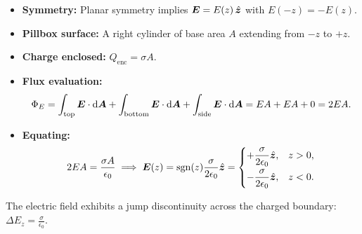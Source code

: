 \begin{example}
\begin{itemize}\itemsep2pt
    \item \textbf{Symmetry:} Planar symmetry implies $\vb*{E} = E(z)\,\hat{\vb*{z}}$ with $E(-z) = -E(z)$.
    \item \textbf{Pillbox surface:} A right cylinder of base area $A$ extending from $-z$ to $+z$.
    \item \textbf{Charge enclosed:} $Q_{\text{enc}} = \sigma A$.
    \item \textbf{Flux evaluation:}
    \begin{equation}
        \Phi_E = \int_{\text{top}} \vb*{E} \cdot \dd{\vb*{A}} + \int_{\text{bottom}} \vb*{E} \cdot \dd{\vb*{A}} + \int_{\text{side}} \vb*{E} \cdot \dd{\vb*{A}} = EA + EA + 0 = 2EA.
    \end{equation}
    \item \textbf{Equating:}
    \begin{equation}
        2EA = \frac{\sigma A}{\epsilon_0} \implies \vb*{E}(z) = \operatorname{sgn}(z)\frac{\sigma}{2\epsilon_0}\hat{\vb*{z}} = 
        \begin{cases}
            +\dfrac{\sigma}{2\epsilon_0}\hat{\vb*{z}}, & z > 0, \\[0.7em]
            -\dfrac{\sigma}{2\epsilon_0}\hat{\vb*{z}}, & z < 0.
        \end{cases}
    \end{equation}
\end{itemize}

\begin{center}
\end{center}
The electric field exhibits a jump discontinuity across the charged boundary: $\Delta E_z = \frac{\sigma}{\epsilon_0}$.
\end{example}

